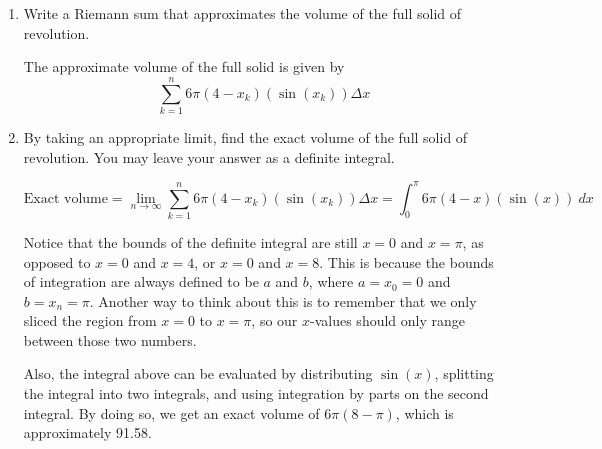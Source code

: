 \documentclass[main]{subfiles}
\begin{document}
\begin{enumerate}
\begin{enumerate}
\begin{enumerate}
\begin{solution}
Notice that we are still expressing the volume of the $k$-th slice entirely in terms of $x_k$ and $\Delta x$, so that we may use a Riemann sum later on. Also note that we could have expressed the radius of the shell as $4-x_{k-1}$ if we decided to measure the radius from the center line to the \textit{outer} edge of the shell. But again, it is more convenient for our Riemann sum notation to use $x_k$. As the number of slices increases, the slices get thinner and $x_k$ and $x_{k-1}$ become infinitely close together, so it doesn't matter which value we use.

\end{solution}

\item
\begin{problem}[1.2in]
Write a Riemann sum that approximates the volume of the full solid of revolution.
\end{problem}

\begin{solution}
The approximate volume of the full solid is given by $$\boxed{\sum_{k=1}^n 6\pi(4-x_k)(\sin(x_k))\Delta x}$$

\end{solution}

\item
\begin{problem}[1.2in]
By taking an appropriate limit, find the exact volume of the full solid of revolution. You may leave your answer as a definite integral.
\end{problem}

\begin{solution}
$$\text{Exact volume} = \lim_{n \to \infty}\sum_{k=1}^n 6\pi(4-x_k)(\sin(x_k))\Delta x = \boxed{\int_0^\pi 6\pi(4-x)(\sin(x))\ dx}$$

Notice that the bounds of the definite integral are still $x=0$ and $x=\pi$, as opposed to $x=0$ and $x= 4$, or $x=0$ and $x=8$. This is because the bounds of integration are always defined to be $a$ and $b$, where $a=x_0=0$ and $b=x_n=\pi$. Another way to think about this is to remember that we only sliced the region from $x=0$ to $x=\pi$, so our $x$-values should only range between those two numbers.

Also, the integral above can be evaluated by distributing $\sin(x)$, splitting the integral into two integrals, and using integration by parts on the second integral. By doing so, we get an exact volume of $6\pi(8-\pi)$, which is approximately 91.58.

\end{solution}


\end{enumerate}
\end{enumerate}
\end{enumerate}
\end{document}
